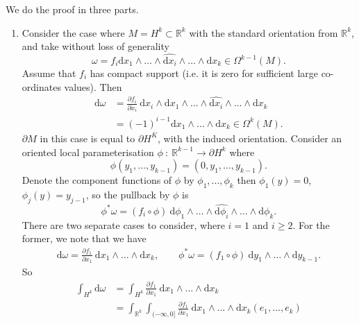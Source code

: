 \documentclass[letter-paper]{tufte-book}
\newenvironment{proof}[1][Proof]{\begin{trivlist}
\item[\hskip \labelsep {\bfseries #1}]}{\end{trivlist}}
\begin{document}
\begin{proof}
  We do the proof in three parts.
  \begin{enumerate}
    \item Consider the case where $M = H^k \subset \mathbb{R}^k$ with the standard orientation from $\mathbb{R}^k$, and take without loss of generality
    \begin{equation*}
      \omega = f_i \mathrm{d}x_1 \wedge \ldots \wedge \widehat{\mathrm{d}x_i} \wedge \ldots \wedge \mathrm{d}x_k \in \Omega^{k-1}(M).
    \end{equation*}
    Assume that $f_i$ has compact support (i.e. it is zero for sufficient large co-ordinates values). Then
    \begin{align*}
      \mathrm{d}\omega
        &= \frac{\partial f_i}{\partial x_i}\ \mathrm{d}x_i \wedge \mathrm{d}x_1 \wedge \ldots \wedge \widehat{\mathrm{d}x_i} \wedge \ldots \wedge \mathrm{d}x_k\\
        &= (-1)^{i-1} \mathrm{d}x_1 \wedge \ldots \wedge \mathrm{d}x_k \in \Omega^{k}(M).
    \end{align*}
    $\partial M$ in this case is equal to $\partial H^K$, with the induced orientation. Consider an oriented local parameterisation $\phi\ :\ \mathbb{R}^{k-1} \to \partial H^k$ where
    \begin{equation*}
      \phi(y_1, \ldots, y_{k-1}) = (0, y_1, \ldots, y_{k-1}).
    \end{equation*}
    Denote the component functions of $\phi$ by $\phi_1, \ldots, \phi_k$ then $\phi_1(y) = 0$, $\phi_j(y) = y_{j-1}$, so the pullback by $\phi$ is
    \begin{equation*}
      \phi^* \omega = (f_i \circ \phi)\ \mathrm{d}\phi_1 \wedge \ldots \wedge \widehat{\mathrm{d}\phi_i} \wedge \ldots \wedge \mathrm{d}\phi_k.
    \end{equation*}
    There are two separate cases to consider, where $i=1$ and $i \geq 2$. For the former, we note that we have
    \begin{align*}
      \mathrm{d}\omega = \frac{\partial f_1}{\partial x_1}\ \mathrm{d}x_1 \wedge \ldots \wedge \mathrm{d}x_k, \qquad \phi^* \omega = (f_1 \circ \phi)\ \mathrm{d}y_1 \wedge \ldots \wedge \mathrm{d}y_{k-1}.
    \end{align*}
    So
    \begin{align*}
      \int_{H^k}\mathrm{d}\omega
        &= \int_{H^k} \frac{\partial f_1}{\partial x_1}\ \mathrm{d}x_1 \wedge \ldots \wedge \mathrm{d}x_k\\
        &= \int_{\mathbb{R}^k}\int_{(-\infty, 0]} \frac{\partial f_1}{\partial x_1}\ \mathrm{d}x_1 \wedge \ldots \wedge \mathrm{d}x_k(e_1, \ldots, e_k)\\

\end{align*}
\end{enumerate}
\end{proof}
\end{document}
